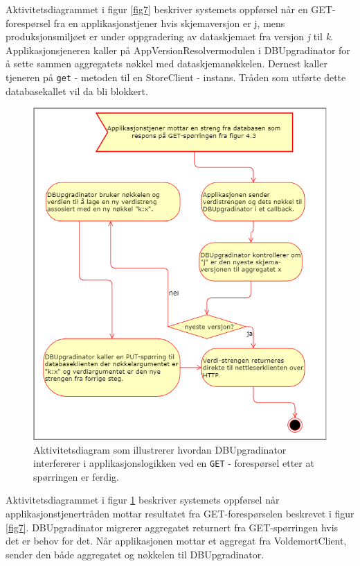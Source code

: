 Aktivitetsdiagrammet i figur \ref{fig7} beskriver systemets oppførsel når en GET-forespørsel fra en applikasjonstjener hvis skjemaversjon er j, mens produksjonsmiljøet er under oppgradering av dataskjemaet fra versjon \emph{j} til \emph{k}. Applikasjonsjeneren kaller på AppVersionResolver\-modulen i DBUpgradinator for å sette sammen aggregatets nøkkel med dataskjemanøkkelen. Dernest kaller tjeneren på \texttt{get} - metoden til en StoreClient - instans. Tråden som utførte dette databasekallet vil da bli blokkert.

\begin{figure}[hbtp]
  \centering
  \includegraphics[scale=0.6]{fig/dbupgradinator-prosess-2.png}
  \caption{Aktivitetsdiagram som illustrerer hvordan DBUpgradinator interfererer i applikasjonslogikken ved en \texttt{GET} - forespørsel etter at spørringen er ferdig.}
  \label{fig8}
\end{figure}

Aktivitetsdiagrammet i figur \ref{fig8} beskriver systemets oppførsel når applikasjons\-tjener\-tråden mottar resultatet fra GET-forespørselen beskrevet i figur \ref{fig7}. DBUpgradinator migrerer aggregatet returnert fra GET-spørringen hvis det er behov for det. Når applikasjonen mottar et aggregat fra VoldemortClient, sender den både aggregatet og nøkkelen til DBUpgradinator.

